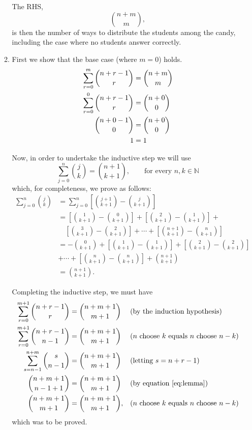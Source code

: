 \documentclass[a4paper,11pt]{article}
\begin{document}
\begin{enumerate}
\begin{enumerate}
			The RHS,
			\begin{equation*}
				\binom{n + m}{m},
			\end{equation*}
			is then the number of ways to distribute the students among the candy, including the case where no students answer correctly.
			
			\item First we show that the base case (where $m = 0$) holds.
			\begin{align}
				\sum\limits_{r=0}^{m} \binom{n + r - 1}{r} &= \binom{n + m}{m} \label{eq:q3} \\
				\sum\limits_{r=0}^{0} \binom{n + r - 1}{r} &= \binom{n + 0}{0} \notag \\
				\binom{n + 0 - 1}{0} &= \binom{n + 0}{0} \notag \\
				1 &= 1 \notag
			\end{align}
			
			Now, in order to undertake the inductive step we will use
			\begin{equation}
				\sum\limits_{j = 0}^{n} \binom{j}{k} = \binom{n+1}{k+1}, \qquad \text{for every $n, k \in \mathbb{N}$} \label{eq:lemma}
			\end{equation}
			which, for completeness, we prove as follows:
			\begin{align*}
				\sum\limits_{j = 0}^{n} \binom{j}{k} &= \sum\limits_{j = 0}^{n} \left[ \binom{j+1}{k+1} - \binom{j}{k+1} \right] \\
				&= \left[ \binom{1}{k+1} - \binom{0}{k+1} \right] + 
				\left[ \binom{2}{k+1} - \binom{1}{k+1} \right] + \\
				& \quad \left[ \binom{3}{k+1} - \binom{2}{k+1} \right] + \cdots
				+ \left[ \binom{n+1}{k+1} - \binom{n}{k+1} \right] \\
				&= - \binom{0}{k+1} + \left[ \binom{1}{k+1} - \binom{1}{k+1} \right] + 
				\left[ \binom{2}{k+1} - \binom{2}{k+1} \right] \\
				& + \cdots
				+ \left[ \binom{n}{k+1} - \binom{n}{k+1} \right] + \binom{n+1}{k+1} \\
				&= \binom{n+1}{k+1}.
			\end{align*}
			
			Completing the inductive step, we must have
			\begin{align*}
				\sum\limits_{r=0}^{m+1} \binom{n + r - 1}{r} &= \binom{n + m+1}{m+1} && \text{(by the induction hypothesis)} \\
				\sum\limits_{r=0}^{m+1} \binom{n + r - 1}{n-1} &= \binom{n + m+1}{m+1} && \text{($n$ choose $k$ equals $n$ choose $n-k$)} \\
				\sum\limits_{s=n-1}^{n + m} \binom{s}{n-1} &= \binom{n + m+1}{m+1} && \text{(letting $s = n + r - 1$)} \\
				\binom{n + m + 1}{n-1+1} &= \binom{n + m+1}{m+1} && \text{(by equation \eqref{eq:lemma})} \\
				\binom{n + m+1}{m+1} &= \binom{n + m+1}{m+1}, && \text{($n$ choose $k$ equals $n$ choose $n-k$)}
			\end{align*}
			which was to be proved.
		\end{enumerate}
		

\end{enumerate}
\end{document}
